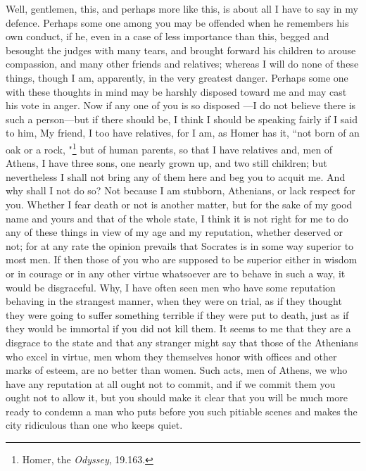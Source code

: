\documentclass[letterpaper,12pt]{article}
\newcommand{\stephpag}[1]{\marginnote{\small\itshape\fontfamily{ppl}\selectfont #1}}
\begin{document}
Well, gentlemen, this, and perhaps more like this, is about all I have to say in my defence. Perhaps some one among you may be offended \stephpag{c} when he remembers his own conduct, if he, even in a case of less importance than this, begged and besought the judges with many tears, and brought forward his children to arouse compassion, and many other friends and relatives; whereas I will do none of these things, though I am, apparently, in the very greatest danger. Perhaps some one with these thoughts in mind may be harshly disposed toward me and may cast his vote in anger. Now if any one of you is so disposed \stephpag{d} ---I do not believe there is such a person---but if there should be, I think I should be speaking fairly if I said to him, My friend, I too have relatives, for I am, as Homer has it, ``not born of an oak or a rock,
"\footnote{Homer, the \emph{Odyssey}, 19.163.} but of human parents, so that I have relatives and, men of Athens, I have three sons, one nearly grown up, and two still children; but nevertheless I shall not bring any of them here and beg you to acquit me. And why shall I not do so? Not because I am stubborn, Athenians, \stephpag{e} or lack respect for you. Whether I fear death or not is another matter, but for the sake of my good name and yours and that of the whole state, I think it is not right for me to do any of these things in view of my age and my reputation, whether deserved or not; for at any rate the opinion prevails that Socrates \stephpag{35 a} is in some way superior to most men. If then those of you who are supposed to be superior either in wisdom or in courage or in any other virtue whatsoever are to behave in such a way, it would be disgraceful. Why, I have often seen men who have some reputation behaving in the strangest manner, when they were on trial, as if they thought they were going to suffer something terrible if they were put to death, just as if they would be immortal if you did not kill them. It seems to me that they are a disgrace to the state and that any stranger might say that those of the Athenians who excel \stephpag{b} in virtue, men whom they themselves honor with offices and other marks of esteem, are no better than women. Such acts, men of Athens, we who have any reputation at all ought not to commit, and if we commit them you ought not to allow it, but you should make it clear that you will be much more ready to condemn a man who puts before you such pitiable scenes and makes the city ridiculous than one who keeps quiet.
\end{document}
